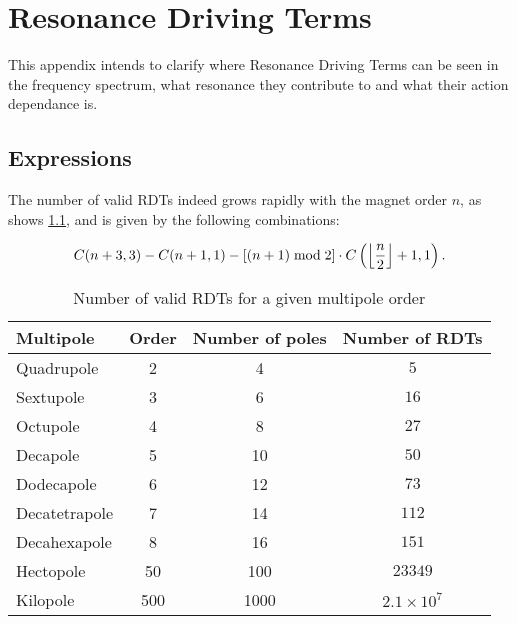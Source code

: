 \chapter{Resonance Driving Terms}
\label{appendix:rdts}
\thumbforappendix
\par

This appendix intends to clarify where Resonance Driving Terms can be seen in the frequency
spectrum, what resonance they contribute to and what their action dependance is.  


\section{Expressions}

The number of valid RDTs indeed grows rapidly with the magnet order $n$, as shows
\cref{table:appendix:number_rdts}, and is given by the following combinations:

\begin{equation}
    C(n+3, 3) - C(n+1,1) - \left[(n+1) \;\mathrm{mod}\; 2\right] \cdot C\left(\floor*{\frac{n}{2}}+1, 1\right).
    \label{eq:number_rdts}
\end{equation}

\begin{table}[H]
  \centering
  \begin{tabular}{lccc}
  Multipole     & Order & Number of poles & Number of RDTs             \\
  \hline
  Quadrupole    & 2     & 4    & $5  $                                 \\ 
  Sextupole     & 3     & 6    & $16  $                                \\ 
  Octupole      & 4     & 8    & $27  $                                \\ 
  Decapole      & 5     & 10   & $50  $                                \\ 
  Dodecapole    & 6     & 12   & $73  $                                \\ 
  Decatetrapole & 7     & 14   & $112  $                               \\ 
  Decahexapole  & 8     & 16   & $151  $                               \\ 
  Hectopole     & 50    & 100  & $23349  $                             \\
  Kilopole      & 500   & 1000 & $2.1 \times 10^7$ \\ \hline
  \end{tabular}
  \caption{Number of valid RDTs for a given multipole order}
  \label{table:appendix:number_rdts}
\end{table}


